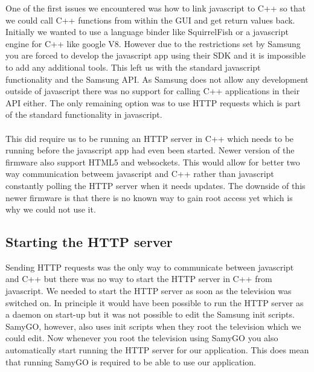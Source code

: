 One of the first issues we encountered was how to link javascript to C++ so that we could call C++ functions from within the GUI and get return values back. Initially we wanted to use a language binder like SquirrelFish or a javascript engine for C++ like google V8. However due to the restrictions set by Samsung you are forced to develop the javascript app using their SDK and it is impossible to add any additional tools. This left us with the standard javascript functionality and the Samsung API. As Samsung does not allow any development outside of javascript there was no support for calling C++ applications in their API either. The only remaining option was to use HTTP requests which is part of the standard functionality in javascript.
\\\\
This did require us to be running an HTTP server in C++ which needs to be running before the javascript app had even been started. Newer version of the firmware also support HTML5 and websockets. This would allow for better two way communication betweem javascript and C++ rather than javascript constantly polling the HTTP server when it needs updates. The downside of this newer firmware is that there is no known way to gain root access yet which is why we could not use it.

\subsection{Starting the HTTP server}

Sending HTTP requests was the only way to communicate between javascript and C++ but there was no way to start the HTTP server in C++ from javascript. We needed to start the HTTP server as soon as the television was switched on. In principle it would have been possible to run the HTTP server as a daemon on start-up but it was not possible to edit the Samsung init scripts. SamyGO, however, also uses init scripts when they root the television which we could edit. Now whenever you root the television using SamyGO you also automatically start running the HTTP server for our application. This does mean that running SamyGO is required to be able to use our application.
